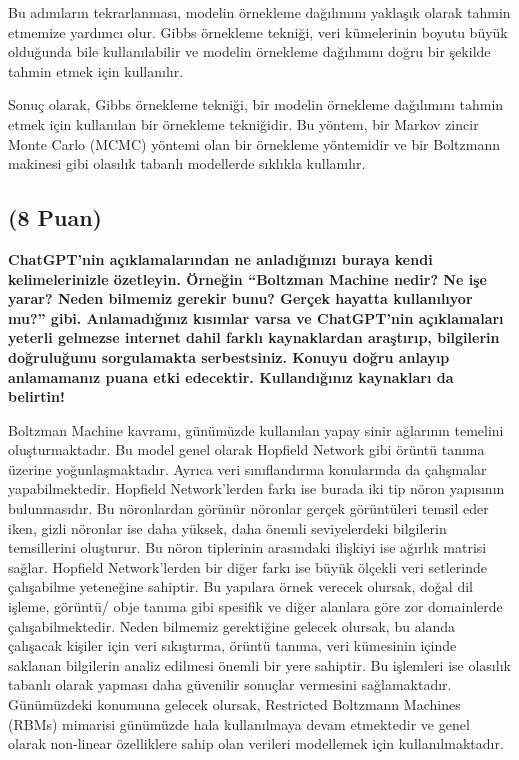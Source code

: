 \documentclass[11pt]{article}
\begin{document}
Bu adımların tekrarlanması, modelin örnekleme dağılımını yaklaşık olarak tahmin etmemize yardımcı olur. Gibbs örnekleme tekniği, veri kümelerinin boyutu büyük olduğunda bile kullanılabilir ve modelin örnekleme dağılımını doğru bir şekilde tahmin etmek için kullanılır.

Sonuç olarak, Gibbs örnekleme tekniği, bir modelin örnekleme dağılımını tahmin etmek için kullanılan bir örnekleme tekniğidir. Bu yöntem, bir Markov zincir Monte Carlo (MCMC) yöntemi olan bir örnekleme yöntemidir ve bir Boltzmann makinesi gibi olasılık tabanlı modellerde sıklıkla kullanılır.
\subsection{(8 Puan)} \textbf{ChatGPT’nin açıklamalarından ne anladığınızı buraya kendi kelimelerinizle özetleyin. Örneğin ``Boltzman Machine nedir? Ne işe yarar? Neden bilmemiz gerekir bunu? Gerçek hayatta kullanılıyor mu?'' gibi. Anlamadığınız kısımlar varsa ve ChatGPT’nin açıklamaları yeterli gelmezse internet dahil farklı kaynaklardan araştırıp, bilgilerin doğruluğunu sorgulamakta serbestsiniz. Konuyu doğru anlayıp anlamamanız puana etki edecektir. Kullandığınız kaynakları da belirtin!}

Boltzman Machine kavramı, günümüzde kullanılan yapay sinir ağlarının temelini oluşturmaktadır. Bu model genel olarak Hopfield Network gibi örüntü tanıma üzerine yoğunlaşmaktadır. Ayrıca veri sınıflandırma konularında da çalışmalar yapabilmektedir. Hopfield Network'lerden farkı ise burada iki tip nöron yapısının bulunmasıdır. Bu nöronlardan görünür nöronlar gerçek görüntüleri temsil eder iken, gizli nöronlar ise daha yüksek, daha önemli seviyelerdeki bilgilerin temsillerini oluşturur. Bu nöron tiplerinin arasındaki ilişkiyi ise ağırlık matrisi sağlar. Hopfield Network'lerden bir diğer farkı ise büyük ölçekli veri setlerinde çalışabilme yeteneğine sahiptir. Bu yapılara örnek verecek olursak, doğal dil işleme, görüntü/ obje tanıma gibi spesifik ve diğer alanlara göre zor domainlerde çalışabilmektedir.
Neden bilmemiz gerektiğine gelecek olursak, bu alanda çalışacak kişiler için veri sıkıştırma, örüntü tanıma, veri kümesinin içinde saklanan bilgilerin analiz edilmesi önemli bir yere sahiptir. Bu işlemleri ise olasılık tabanlı olarak yapması daha güvenilir sonuçlar vermesini sağlamaktadır. Günümüzdeki konumuna gelecek olursak, Restricted Boltzmann Machines (RBMs) mimarisi günümüzde hala kullanılmaya devam etmektedir ve genel olarak non-linear özelliklere sahip olan verileri modellemek için kullanılmaktadır.
\end{document}
